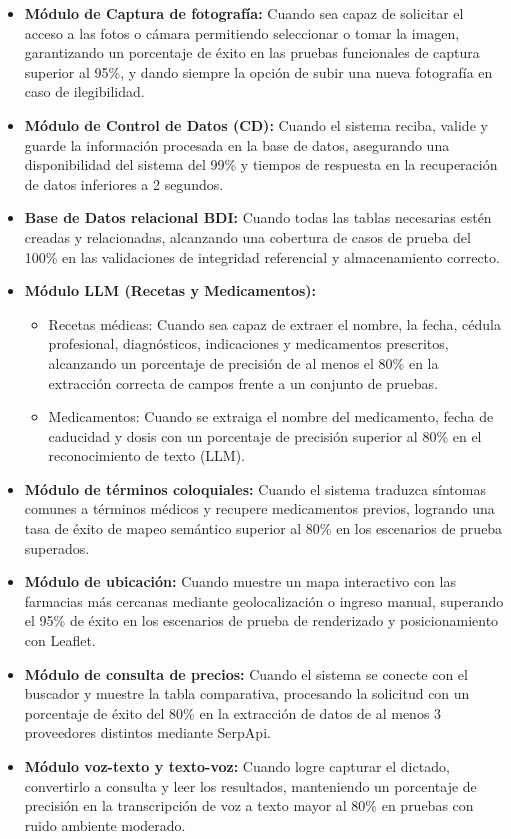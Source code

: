 \begin{itemize}
    \item \textbf{Módulo de Captura de fotografía:} Cuando sea capaz de solicitar el acceso a las fotos o cámara permitiendo seleccionar o tomar la imagen, garantizando un porcentaje de éxito en las pruebas funcionales de captura superior al 95\%, y dando siempre la opción de subir una nueva fotografía en caso de ilegibilidad.
    \item \textbf{Módulo de Control de Datos (CD):} Cuando el sistema reciba, valide y guarde la información procesada en la base de datos, asegurando una disponibilidad del sistema del 99\% y tiempos de respuesta en la recuperación de datos inferiores a 2 segundos.
    \item \textbf{Base de Datos relacional BDI:} Cuando todas las tablas necesarias estén creadas y relacionadas, alcanzando una cobertura de casos de prueba del 100\% en las validaciones de integridad referencial y almacenamiento correcto.
    \item \textbf{Módulo LLM (Recetas y Medicamentos):} 
        \begin{itemize}
        \item Recetas médicas: Cuando sea capaz de extraer el nombre, la fecha, cédula profesional, diagnósticos, indicaciones y medicamentos prescritos, alcanzando un porcentaje de precisión de al menos el 80\% en la extracción correcta de campos frente a un conjunto de pruebas.
        \item Medicamentos: Cuando se extraiga el nombre del medicamento, fecha de caducidad y dosis con un porcentaje de precisión superior al 80\% en el reconocimiento de texto (LLM).
        \end{itemize}
    \item \textbf{Módulo de términos coloquiales:} Cuando el sistema traduzca síntomas comunes a términos médicos y recupere medicamentos previos, logrando una tasa de éxito de mapeo semántico superior al 80\% en los escenarios de prueba superados.
    \item \textbf{Módulo de ubicación:} Cuando muestre un mapa interactivo con las farmacias más cercanas mediante geolocalización o ingreso manual, superando el 95\% de éxito en los escenarios de prueba de renderizado y posicionamiento con Leaflet.
    \item \textbf{Módulo de consulta de precios:} Cuando el sistema se conecte con el buscador y muestre la tabla comparativa, procesando la solicitud con un porcentaje de éxito del 80\% en la extracción de datos de al menos 3 proveedores distintos mediante SerpApi.
    \item \textbf{Módulo voz-texto y texto-voz:} Cuando logre capturar el dictado, convertirlo a consulta y leer los resultados, manteniendo un porcentaje de precisión en la transcripción de voz a texto mayor al 80\% en pruebas con ruido ambiente moderado.
\end{itemize}

